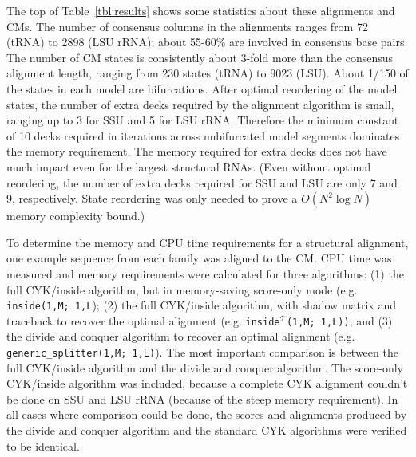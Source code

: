 \documentclass[11pt]{article}
\begin{document}
The top of Table~\ref{tbl:results} shows some statistics about these
alignments and CMs. The number of consensus columns in the alignments
ranges from 72 (tRNA) to 2898 (LSU rRNA); about 55-60\% are involved
in consensus base pairs. The number of CM states is consistently about
3-fold more than the consensus alignment length, ranging from 230
states (tRNA) to 9023 (LSU). About 1/150 of the states in each model
are bifurcations. After optimal reordering of the model states, the
number of extra decks required by the alignment algorithm is small,
ranging up to 3 for SSU and 5 for LSU rRNA. Therefore the minimum
constant of 10 decks required in iterations across unbifurcated model
segments dominates the memory requirement. The memory required for
extra decks does not have much impact even for the largest structural
RNAs. (Even without optimal reordering, the number of extra decks
required for SSU and LSU are only 7 and 9, respectively. State
reordering was only needed to prove a $O(N^2\log N)$ memory complexity
bound.)

To determine the memory and CPU time requirements for a structural
alignment, one example sequence from each family was aligned to the
CM. CPU time was measured and memory requirements were calculated for
three algorithms: (1) the full CYK/inside algorithm, but in
memory-saving score-only mode (e.g. \texttt{inside(1,M; 1,L}); (2) the
full CYK/inside algorithm, with shadow matrix and traceback to recover
the optimal alignment (e.g. \texttt{inside}$^\mathcal{T}$\texttt{(1,M;
1,L))}; and (3) the divide and conquer algorithm to recover an optimal
alignment (e.g. \texttt{generic\_splitter(1,M; 1,L)}). The most
important comparison is between the full CYK/inside algorithm and the
divide and conquer algorithm. The score-only CYK/inside algorithm was
included, because a complete CYK alignment couldn't be done on SSU and
LSU rRNA (because of the steep memory requirement). In all cases where
comparison could be done, the scores and alignments produced by the
divide and conquer algorithm and the standard CYK algorithms were
verified to be identical.
\end{document}
